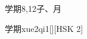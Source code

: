 \begin{entry}{学期}{8,12}{⼦、⽉}
  \begin{phonetics}{学期}{xue2qi1}[][HSK 2]
  \end{phonetics}
\end{entry}
